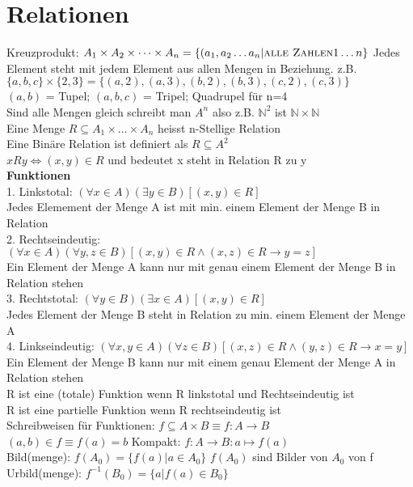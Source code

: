\documentclass[a4paper]{scrartcl}
\begin{document}
\section{Relationen}
Kreuzprodukt: $ A_1 \times A_2 \times \dots \times A_n = \{(a_1,a_2\dots a_n | \textsc{alle Zahlen} 1 \dots n\}$ Jedes Element steht mit jedem Element aus allen Mengen in Beziehung. z.B.$\{a,b,c\} \times \{2,3\} = \{(a,2),(a,3),(b,2),(b,3),(c,2),(c,3)\}$\\
$(a,b)$ = Tupel; $(a,b,c)$ = Tripel; Quadrupel für n=4\\
Sind alle Mengen gleich schreibt man $A^n$ also z.B. $\mathbb{N}^2$ ist $\mathbb{N} \times \mathbb{N}$\\
Eine Menge $R \subseteq A_1\times \dots \times A_n$ heisst n-Stellige Relation\\ 
Eine Binäre Relation ist definiert als $R \subseteq A^2$\\ $xRy \Leftrightarrow (x,y) \in R$ und bedeutet x steht in Relation R zu y\\ 
\textbf{Funktionen}\\
1. Linkstotal: $(\forall x \in A)(\exists y \in B)[(x,y)\in R]$ \\
Jedes Elemement der Menge A ist mit min. einem Element der Menge B in Relation\\
2. Rechtseindeutig: $(\forall x \in A)(\forall y,z \in B)[(x,y)\in R \wedge (x,z) \in R \to y = z]$\\
Ein Element der Menge A kann nur mit genau einem Element der Menge B in Relation stehen\\
3. Rechtstotal: $(\forall y \in B)(\exists x \in A)[(x,y)\in R]$\\
Jedes Element der Menge B steht in Relation zu min. einem Element der Menge A\\
4. Linkseindeutig: $(\forall x,y \in A)(\forall z \in B)[(x,z)\in R \wedge (y,z)\in R \to x = y]$\\
Ein Element der Menge B kann nur mit einem genau Element der Menge A in Relation stehen\\ 

R ist eine (totale) Funktion wenn R linkstotal und Rechtseindeutig ist\\
R ist eine partielle Funktion wenn R rechtseindeutig ist\\

Schreibweisen für Funktionen: $f \subseteq A\times B \equiv f:A \to B$\\
$(a,b)\in f \equiv f(a) = b$ Kompakt: $ f: A \to B: a \mapsto f(a)$\\
Bild(menge): $f(A_0)=\{f(a)| a \in A_0\}$ $f(A_0)$ sind Bilder von $A_0$ von f\\ Urbild(menge):
$f^{-1}(B_0) = \{a|f(a) \in B_0\}$ \\
\end{document}
